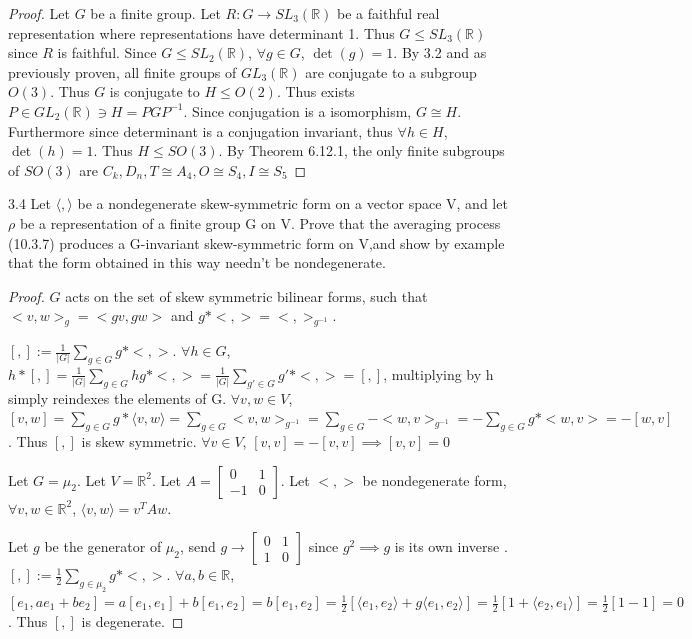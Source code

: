 \documentclass{article}
\newcommand{\R}{\mathbb{R}}
\newcommand{\angles}[1]{\langle #1 \rangle}
\begin{document}
\begin{proof}
    Let $G$ be a finite group. Let $R: G \to SL_3(\R)$ be a faithful real representation where representations have determinant 1. Thus $G \leq SL_3(\R)$ since $R$ is faithful. Since $G \leq SL_2(\R)$, $\forall g \in G$, $\det(g) = 1$. By 3.2 and as previously proven, all finite groups of $GL_3(\R)$ are conjugate to a subgroup $O(3)$. Thus $G$ is conjugate to $H \leq O(2)$. Thus exists $P \in GL_2(\R) \ni H = PGP^{-1}$. Since conjugation is a isomorphism, $G \cong H$. Furthermore since determinant is a conjugation invariant, thus $\forall h \in H$, $\det(h) = 1$. Thus $H \leq SO(3)$. By Theorem 6.12.1, the only finite subgroups of $SO(3)$  are $C_k, D_n, T \cong A_4, O \cong S_4, I \cong S_5$     
\end{proof}

\begin{PROB}{3.4}\label{Problem 3.4.}
    Let $\angles{,}$ be a nondegenerate skew-symmetric form on a vector space V, and let $\rho$  be a representation of a finite group G on V. Prove that the averaging process (10.3.7) produces a G-invariant skew-symmetric form on V,and show by example that the form obtained in this way needn't be nondegenerate.
\end{PROB}
\begin{proof}
    $G$ acts on the set of skew symmetric bilinear forms, such that $< v,w >_g = <gv, gw>$ and $g * <, > = <,>_{g^{-1}}$.    

    $[ , ] := \frac{1}{|G|} \sum_{g \in G} g * <,>$. $\forall h \in G$, $h * [,] = \frac{1}{|G|} \sum_{g \in G} hg * <,> = \frac{1}{|G|} \sum_{g' \in G} g' * <,> = [ , ]$, multiplying by h simply reindexes the elements of G. $\forall v,w \in V$, $[v, w] = \sum_{g \in G} g * \angles{v, w} = \sum_{g \in G} <v,w>_{g^{-1}} = \sum_{g \in G} -<w, v>_{g^{-1}} = - \sum_{g \in G} g * <w, v> = -[w, v]$. Thus $[,]$ is skew symmetric. $\forall v \in V$, $[v, v] = -[v,v] \implies [v, v] = 0$  
    
    Let $G = \mu_2$. Let $V = \R^2$. Let $A = \begin{bmatrix}
        0 & 1 \\ -1 & 0
    \end{bmatrix}$. Let $< , >$ be nondegenerate form, $\forall v,w \in \R^2$, $\angles{v, w} = v^TAw$.   
    
    
    Let $g$ be the generator of $\mu_2$, send $g \to \begin{bmatrix}
        0 & 1 \\ 1 & 0
    \end{bmatrix}$ since $g^2 \implies g$ is its own inverse . $[ , ] := \frac{1}{2} \sum_{g \in \mu_2} g * <,>$. $\forall a, b \in \R$, $[e_1, ae_1 + be_2] = a[e_1, e_1] + b[e_1, e_2] = b[e_1, e_2] = \frac{1}{2}[ \angles{e_1, e_2} + g \angles{e_1, e_2}] = \frac{1}{2}[1 + \angles{e_2, e_1}] = \frac{1}{2}[1 - 1] = 0$. Thus $[ , ]$ is degenerate.      
\end{proof}
\end{document}
